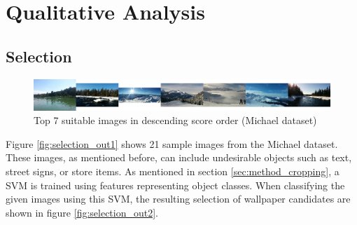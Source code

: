 %
\newpage
\chapter{Qualitative Analysis}

\section{Selection}

\begin{figure}
\centering\includegraphics[width=1.0\columnwidth]{../figures/top7_suitable.jpg}
\caption{Top 7 suitable images in descending score order (Michael dataset)\label{fig:selection_top7}}
\end{figure}

Figure \ref{fig:selection_out1} shows 21 sample images from the Michael dataset.
These images, as mentioned before, can include undesirable objects such as text,
street signs, or store items.
As mentioned in section \ref{sec:method_cropping}, a SVM is trained using
features representing object classes.
When classifying the given images using this SVM, the resulting selection of
wallpaper candidates are shown in figure \ref{fig:selection_out2}.

